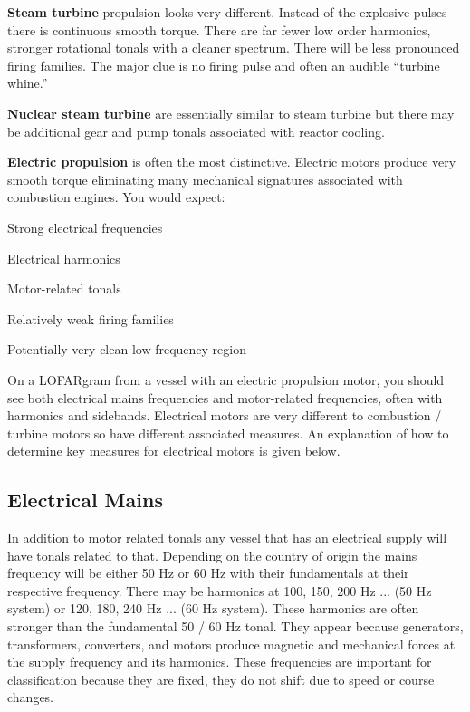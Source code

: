 \textbf{Steam turbine} propulsion looks very different. Instead of the explosive pulses there is continuous smooth torque. There are far fewer low order harmonics, stronger rotational tonals with a cleaner spectrum. There will be less pronounced firing families. The major clue is no firing pulse and often an audible “turbine whine.”

\textbf{Nuclear steam turbine} are essentially similar to steam turbine but there may be additional gear and pump tonals associated with reactor cooling.



\textbf{Electric propulsion} is often the most distinctive. Electric motors produce very smooth torque eliminating many mechanical signatures associated with combustion engines. You would expect:

\begin{compactitem}
    \item Strong electrical frequencies
    \item Electrical harmonics
    \item Motor-related tonals
    \item Relatively weak firing families
    \item Potentially very clean low-frequency region
\end{compactitem}

On a LOFARgram from a vessel with an electric propulsion motor, you should see both electrical mains frequencies and motor-related frequencies, often with harmonics and sidebands. Electrical motors are very different to combustion / turbine motors so have different associated measures. An explanation of how to determine key measures for electrical motors is given below.

\subsection{Electrical Mains}

In addition to motor related tonals any vessel that has an electrical supply will have tonals related to that. Depending on the country of origin the mains frequency will be either 50 Hz or 60 Hz with their fundamentals at their respective frequency. There may be harmonics at 100, 150, 200 Hz ... (50 Hz system) or 120, 180, 240 Hz ... (60 Hz system). These harmonics are often stronger than the fundamental 50 / 60 Hz tonal. They appear because generators, transformers, converters, and motors produce magnetic and mechanical forces at the supply frequency and its harmonics. These frequencies are important for classification because they are fixed, they do not shift due to speed or course changes.

